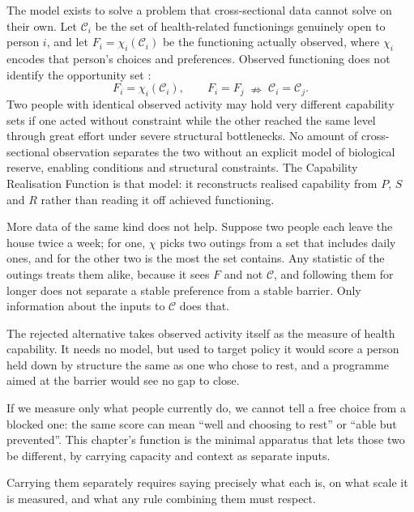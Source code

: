 The model exists to solve a problem that cross-sectional data cannot solve on their
own. Let $\mathcal{C}_i$ be the set of health-related functionings genuinely open to
person $i$, and let $F_i=\chi_i(\mathcal{C}_i)$ be the functioning actually observed,
where $\chi_i$ encodes that person's choices and preferences. Observed functioning
does not identify the opportunity set \citep{sen_1993}:
\begin{equation}
F_i=\chi_i(\mathcal{C}_i), \qquad F_i=F_j \;\nRightarrow\; \mathcal{C}_i=\mathcal{C}_j .
\label{eq:identification}
\end{equation}
Two people with identical observed activity may hold very different capability sets
if one acted without constraint while the other reached the same level through great
effort under severe structural bottlenecks. No amount of cross-sectional observation
separates the two without an explicit model of biological reserve, enabling
conditions and structural constraints. The Capability Realisation Function is that
model: it reconstructs realised capability from $P$, $S$ and $R$ rather than reading
it off achieved functioning.

More data of the same kind does not help. Suppose two people each leave the
house twice a week; for one, $\chi$ picks two outings from a set that includes
daily ones, and for the other two is the most the set contains. Any statistic
of the outings treats them alike, because it sees $F$ and not $\mathcal{C}$,
and following them for longer does not separate a stable preference from a
stable barrier. Only information about the inputs to $\mathcal{C}$ does that.

The rejected alternative takes observed activity itself as the measure of
health capability. It needs no model, but used to target policy it would score
a person held down by structure the same as one who chose to rest, and a
programme aimed at the barrier would see no gap to close.
\begin{reading}
If we measure only what people currently do, we cannot tell a free choice from a
blocked one: the same score can mean ``well and choosing to rest'' or ``able but
prevented''. This chapter's function is the minimal apparatus that lets those two be
different, by carrying capacity and context as separate inputs.

Carrying them separately requires saying precisely what each is, on what scale
it is measured, and what any rule combining them must respect.
\end{reading}


